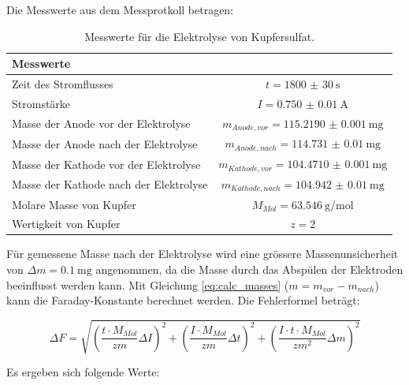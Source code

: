 \documentclass[12pt,a4paper,titlepage]{scrartcl}
\numberwithin{equation}{section}
\numberwithin{table}{section}
\numberwithin{figure}{section}
\begin{document}
Die Messwerte aus dem Messprotkoll betragen:


\begin{table}[H]

    \centering
    \caption{Messwerte für die Elektrolyse von Kupfersulfat.}
    \label{tab:messwerte_kupfersulfat}
    
\begin{tabular}{lc}
        \toprule
        \textbf{Messwerte}\\
        \midrule
        Zeit des Stromflusses & $t = \qty{1800(30)}{\second}$ \\
        Stromstärke & $I = \qty{0.750(10)}{\ampere}$ \\
        Masse der Anode vor der Elektrolyse & $m_{Anode, vor} = \qty{115.2190(10)}{\milli\gram}$ \\
        Masse der Anode nach der Elektrolyse & $m_{Anode, nach} = \qty{114.731(10)}{\milli\gram}$ \\
        Masse der Kathode vor der Elektrolyse & $m_{Kathode, vor} = \qty{104.4710(10)}{\milli\gram}$ \\
        Masse der Kathode nach der Elektrolyse & $m_{Kathode, nach} = \qty{104.942(10)}{\milli\gram}$ \\
        Molare Masse von Kupfer & $M_{Mol} = \qty{63.546}{\gram\per\mol}$ \\
        Wertigkeit von Kupfer & $z = 2$ \\
        \bottomrule
        \end{tabular}
\end{table}
Für gemessene Masse nach der Elektrolyse wird eine grössere Massenunsicherheit von $\Delta m = \qty{0.1}{\milli\gram}$ angenommen, da die Masse durch das Abspülen der Elektroden beeinflusst werden kann.
Mit Gleichung \ref{eq:calc_masses} ($m = m_{vor}-m_{nach}$) kann die Faraday-Konstante berechnet werden.
Die Fehlerformel beträgt:


\begin{equation}
    \Delta F = \sqrt{\left(\frac{t\cdot M_{Mol}}{z m} \Delta I \right)^2 + \left(\frac{I\cdot M_{Mol}}{z m} \Delta t\right)^2 + \left(\frac{I\cdot t\cdot M_{Mol}}{z m^2} \Delta m\right)^2}
\end{equation}

Es ergeben sich folgende Werte:
\end{document}
